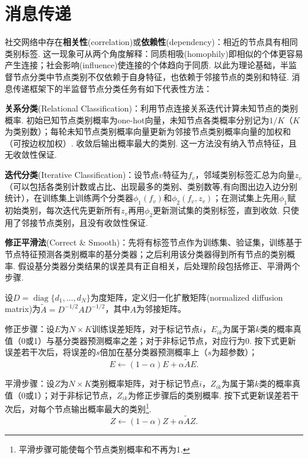 \section{消息传递}
\par 社交网络中存在\textbf{相关性}(correlation)或\textbf{依赖性}(dependency)：相近的节点具有相同类别标签. 这一现象可从两个角度解释：同质相吸(homophily)即相似的个体更容易产生连接；社会影响(influence)使连接的个体趋向于同质. 以此为理论基础，半监督节点分类中节点类别不仅依赖于自身特征，也依赖于邻接节点的类别和特征. 消息传递框架下的半监督节点分类任务有如下代表性方法：

\par \textbf{关系分类}(Relational Classification)：利用节点连接关系迭代计算未知节点的类别概率. 初始已知节点类别概率为one-hot向量，未知节点各类概率分别记为$1/K$（$K$为类别数）；每轮未知节点类别概率向量更新为邻接节点类别概率向量的加权和（可按边权加权）. 收敛后输出概率最大的类别. 这一方法没有纳入节点特征，且无收敛性保证. 

\par \textbf{迭代分类}(Iterative Classification)：设节点$v$特征为$f_v$，邻域类别标签汇总为向量$z_v$（可以包括各类别计数或占比、出现最多的类别、类别数等,有向图出边入边分别统计），在训练集上训练两个分类器$\phi_1(f_v)$和$\phi_2(f_v,z_v)$；在测试集上先用$\phi_1$赋初始类别，每次迭代先更新所有$z_v$再用$\phi_2$更新测试集的类别标签，直到收敛. 只使用了邻接节点类别，且没有收敛性保证. 

\par \textbf{修正平滑法}(Correct \& Smooth)：先将有标签节点作为训练集、验证集，训练基于节点特征预测各类别概率的基分类器；之后利用该分类器得到所有节点的类别概率. 假设基分类器分类结果的误差具有正自相关，后处理阶段包括修正、平滑两个步骤. 
\par 设$D=\operatorname{diag}\{d_1,\dots,d_N\}$为度矩阵，定义归一化扩散矩阵(normalized diffusion matrix)为$\tilde{A}=D^{-1/2}AD^{-1/2}$，其中$A$为邻接矩阵。
\par 修正步骤：设$E$为$N\times K$训练误差矩阵，对于标记节点$i$，$E_{ik}$为属于第$k$类的概率真值（0或1）与基分类器预测概率之差；对于非标记节点，对应行为0. 按下式更新误差若干次后，将误差的$s$倍加在基分类器预测概率上（$s$为超参数）；
\begin{equation}
    E \leftarrow (1-\alpha)E + \alpha \tilde{A}E.
\end{equation}
\par 平滑步骤：设$Z$为$N\times K$类别概率矩阵，对于标记节点$i$，$Z_{ik}$为属于第$k$类的概率真值（0或1）；对于非标记节点，$Z_{ik}$为修正步骤后的类别概率. 按下式更新误差若干次后，对每个节点输出概率最大的类别\footnote{平滑步骤可能使每个节点类别概率和不再为1. }. 
\begin{equation}
    Z \leftarrow (1-\alpha)Z + \alpha \tilde{A}Z.
\end{equation}


